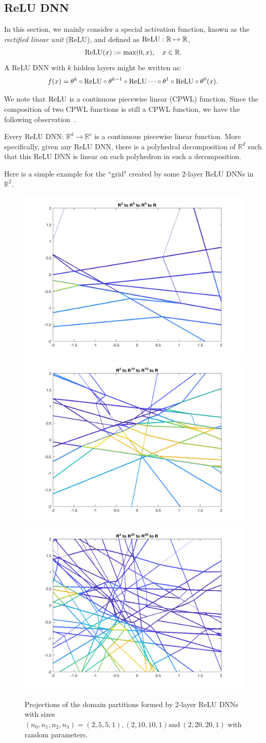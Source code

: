 \subsection{ReLU DNN}
In this section, we mainly consider a special activation function,
known as the {\it rectified linear unit} (ReLU), and defined as $\rm
ReLU: \mathbb R\mapsto \mathbb R$,
\begin{equation}
\label{relu}
 {\rm ReLU}(x):=\max(0,x), \quad x\in\mathbb{R}. 
\end{equation}
A ReLU DNN with $k$ hidden layers might be written as:
\begin{equation}
\label{relu-dnn}
f(x) = \theta^{k}\circ {\rm ReLU} \circ \theta^{k-1} \circ {\rm ReLU} \cdots \circ \theta^1 \circ {\rm ReLU} \circ \theta^0(x).
\end{equation}

We note that $\rm ReLU$ is a continuous piecewise linear (CPWL) function.
Since the composition of two CPWL functions is still a CPWL
function, we have the following observation~\cite{arora2016understanding}.
\begin{lemma}\label{dnn-cpwl}
	Every ReLU DNN: $\mathbb{R}^d\to\mathbb{R}^c$ is a continuous
	piecewise linear function.  More specifically, given any ReLU DNN,
	there is a polyhedral decomposition of $\mathbb R^d$ such that this
	ReLU DNN is linear on each polyhedron in such a decomposition.
\end{lemma}

Here is a simple example for the ``grid" created by some 2-layer ReLU DNNs in $\mathbb{R}^2$.

\begin{figure}[ht]
	\includegraphics[width=.3\textwidth]{figures/2to5to5to1-eps-converted-to.pdf}  
	\includegraphics[width=.3\textwidth]{figures/2to10to10to1-eps-converted-to.pdf}  
	\includegraphics[width=.3\textwidth]{figures/2to20to20to1-eps-converted-to.pdf}  
	\caption{Projections of the domain partitions formed by 2-layer ReLU DNNs with sizes $(n_0, n_1, n_2, n_3)= (2, 5, 5, 1), (2, 10, 10, 1) \text{and}\ (2, 20, 20, 1)$ with random parameters.}
	\label{fig:dnn-region}
\end{figure}

